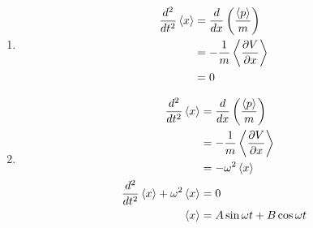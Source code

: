 \documentclass{article}
\begin{document}
\subsection{}

\begin{enumerate}
  \item

        \begin{align*}
          \frac{d^2}{d t^2} \braket{x} & = \frac{d}{d x} \left( \frac{\braket{p}}{m} \right)   \\
                                       & = -\frac{1}{m} \Braket{\frac{\partial V}{\partial x}} \\
                                       & = 0
        \end{align*}

  \item

        \begin{align*}
          \frac{d^2}{d t^2} \braket{x}                       & = \frac{d}{d x} \left( \frac{\braket{p}}{m} \right)   \\
                                                             & = -\frac{1}{m} \Braket{\frac{\partial V}{\partial x}} \\
                                                             & = -\omega^2 \braket{x}                                \\
          \frac{d^2}{d t^2} \braket{x} + \omega^2 \braket{x} & = 0                                                   \\
          \braket{x}                                         & = A \sin \omega t + B \cos \omega t
        \end{align*}
\end{enumerate}

\subsection{}
\end{document}
